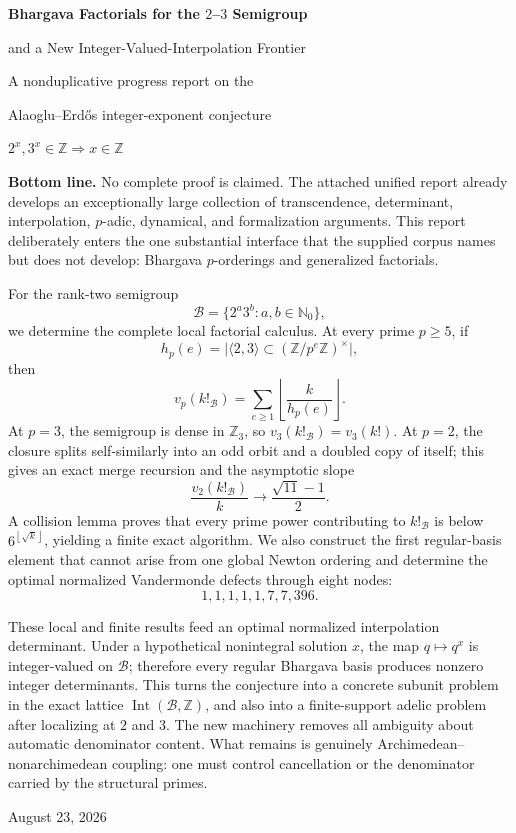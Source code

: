 \documentclass[11pt,oneside]{article}
\theoremstyle{definition}
\theoremstyle{remark}
\newcommand{\Nzero}{\mathbb N_0}
\newcommand{\Z}{\mathbb Z}
\newcommand{\B}{\mathcal B}
\newcommand{\Int}{\operatorname{Int}}
\newcommand{\floor}[1]{\left\lfloor #1\right\rfloor}
\begin{document}

\begin{titlepage}
\centering
\vspace*{0.7cm}
{\Huge\bfseries Bhargava Factorials for the \(2\)--\(3\) Semigroup\par}
\vspace{0.35cm}
{\LARGE and a New Integer-Valued-Interpolation Frontier\par}
\vspace{0.7cm}
{\Large A nonduplicative progress report on the\par}
\vspace{0.12cm}
{\Large Alaoglu--Erd\H{o}s integer-exponent conjecture\par}
\vspace{1.0cm}
{\large \(2^x,3^x\in\Z\Longrightarrow x\in\Z\)\par}
\vfill

\begin{minipage}{0.92\textwidth}
\small
\textbf{Bottom line.}
No complete proof is claimed.  The attached unified report already develops an exceptionally
large collection of transcendence, determinant, interpolation, \(p\)-adic, dynamical, and
formalization arguments.  This report deliberately enters the one substantial interface that
the supplied corpus names but does not develop: Bhargava \(p\)-orderings and generalized
factorials.

For the rank-two semigroup
\[
  \B=\{2^a3^b:a,b\in\Nzero\},
\]
we determine the complete local factorial calculus.  At every prime \(p\ge5\), if
\[
  h_p(e)=\bigl|\langle2,3\rangle\subset(\Z/p^e\Z)^\times\bigr|,
\]
then
\[
  v_p(k!_{\B})=\sum_{e\ge1}\floor{\frac{k}{h_p(e)}}.
\]
At \(p=3\), the semigroup is dense in \(\Z_3\), so \(v_3(k!_{\B})=v_3(k!)\).  At \(p=2\),
the closure splits self-similarly into an odd orbit and a doubled copy of itself; this gives
an exact merge recursion and the asymptotic slope
\[
 \frac{v_2(k!_{\B})}{k}\longrightarrow\frac{\sqrt{11}-1}{2}.
\]
A collision lemma proves that every prime power contributing to \(k!_{\B}\) is below
\(6^{\floor{\sqrt{k}}}\), yielding a finite exact algorithm.  We also construct the first
regular-basis element that cannot arise from one global Newton ordering and determine the
optimal normalized Vandermonde defects through eight nodes:
\[
  1,1,1,1,1,7,7,396.
\]

These local and finite results feed an optimal normalized interpolation determinant.  Under a hypothetical
nonintegral solution \(x\), the map \(q\mapsto q^x\) is integer-valued on \(\B\); therefore every
regular Bhargava basis produces nonzero integer determinants.  This turns the conjecture into a
concrete subunit problem in the exact lattice \(\Int(\B,\Z)\), and also into a finite-support
adelic problem after localizing at \(2\) and \(3\).  The new machinery removes all ambiguity
about automatic denominator content.  What remains is genuinely Archimedean--nonarchimedean
coupling: one must control cancellation or the denominator carried by the structural primes.
\end{minipage}

\vfill
{\large August 23, 2026\par}
\end{titlepage}
\end{document}
